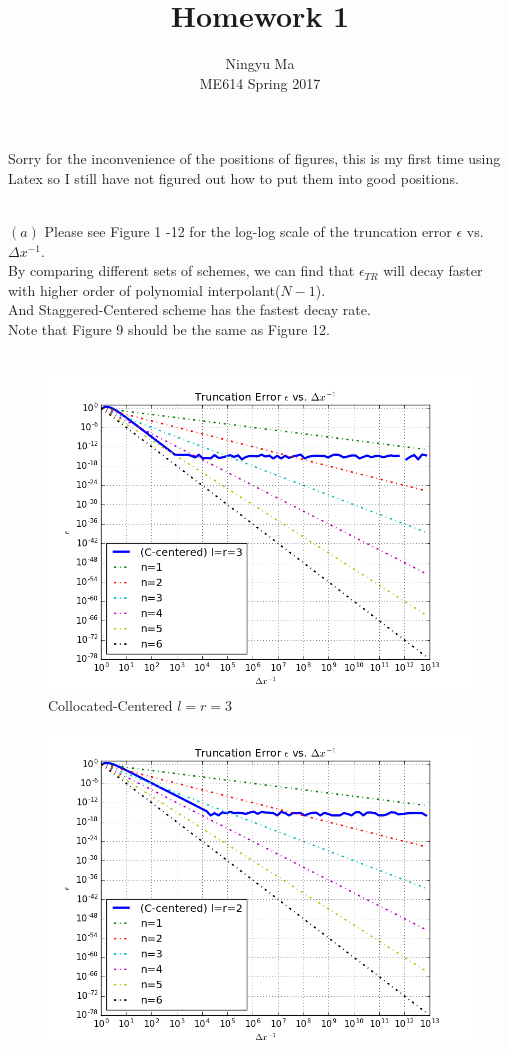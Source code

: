 \documentclass[12pt]{article}
\newenvironment{problem}[2][Problem]{\begin{trivlist}
\item[\hskip \labelsep {\bfseries #1}\hskip \labelsep {\bfseries #2.}]}{\end{trivlist}}
\begin{document}
 
\title{Homework 1}
\author{Ningyu Ma\\ 
ME614 Spring 2017}

\maketitle
Sorry for the inconvenience of the positions of figures, this is my first time using Latex so I still have not figured out how to put them into good positions.
\begin{problem}{1}
\text{}\\
$(a)$ Please see Figure 1 -12 for the log-log scale of the truncation error $\epsilon$ vs. $\Delta x^{-1}$.\\
By comparing different sets of schemes, we can find that $\epsilon_{TR}$ will decay faster with higher order of polynomial interpolant($N-1$).\\
And Staggered-Centered scheme has the fastest decay rate.\\
Note that Figure 9 should be the same as Figure 12.\\
\\
\begin{figure}[h]
\centering
  \includegraphics[scale=0.5]{ccl3r3}
 \caption{Collocated-Centered $l = r= 3$}
\label{label}
\end{figure}
\begin{figure}[h]
\centering
  \includegraphics[scale=0.5]{ccl2r2}

\end{figure}
\end{problem}
\end{document}

